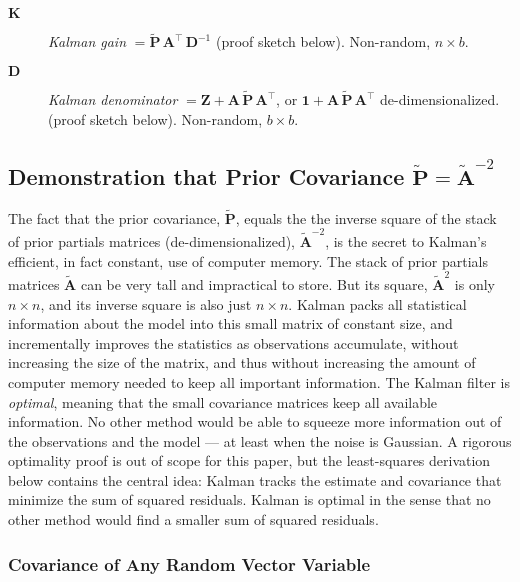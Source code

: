 \documentclass[10pt,oneside,x11names]{article}
\begin{document}
\begin{description}
\item[{\(\mathbold{K}\)}] \emph{Kalman gain}
\(=
     {\tilde{\mathbold{P}}}\,
     \mathbold{A}^\intercal\,
     {\mathbold{D}}^{-1}\) (proof
sketch below).
Non-random, \(n\times{b}\).

\item[{\(\mathbold{D}\)}] \emph{Kalman denominator}
\(=
     \mathbold{Z}+
     \mathbold{A}\,
     {\tilde{\mathbold{P}}}\,
     \mathbold{A}^\intercal\),
or 
\(\mathbold{1}+
     \mathbold{A}\,
     {\tilde{\mathbold{P}}}\,
     \mathbold{A}^\intercal\)
de-dimensionalized.
(proof sketch below). Non-random, \(b\times{b}\).
\end{description}

\subsection{Demonstration that Prior Covariance \({\tilde{\mathbold{P}}} = \tilde{\mathbold{A}}^{-2}\)}
\label{sec:orgheadline11}

The fact that the prior covariance, \(\tilde{\mathbold{P}}\), equals the
the inverse square of
the stack of prior partials matrices (de-dimensionalized), \(\tilde{\mathbold{A}}^{-2}\), is the secret
to Kalman's efficient, in fact constant, use of computer memory. The stack of
prior partials matrices \(\tilde{\mathbold{A}}\) can be very tall and impractical
to store. But its square, \(\tilde{\mathbold{A}}^{2}\) is only \(n\times{n}\), and
its inverse square is also just \(n\times{n}\). Kalman packs all statistical
information about the model into this small matrix of constant size, and
incrementally improves the statistics as observations accumulate, without
increasing the size of the matrix, and thus without increasing the amount of
computer memory needed to keep all important information. The Kalman filter is
\emph{optimal}, meaning that the small covariance matrices keep all available
information. No other method would be able to squeeze more information out of
the observations and the model --- at least when the noise is Gaussian. A
rigorous optimality proof is out of scope for this paper, but the least-squares
derivation below contains the central idea: Kalman tracks the estimate and
covariance that minimize the sum of squared residuals. Kalman is optimal in the
sense that no other method would find a smaller sum of squared residuals.


\subsubsection{Covariance of Any Random Vector Variable}
\label{sec:orgheadline6}
\end{document}
